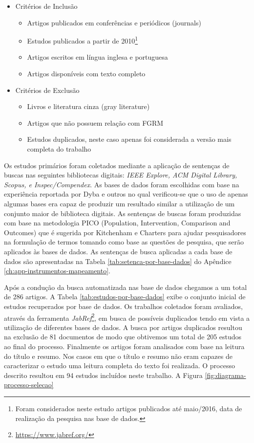 \documentclass[msc]{ppgccufmg} %
\begin{document}
\begin{itemize}
	\item Critérios de Inclusão
		\begin{itemize}
			 \item Artigos publicados em conferências e periódicos (journals)
			 \item Estudos publicados a partir de 2010\footnote{Foram considerados neste estudo artigos publicados até maio/2016, data de realização da pesquisa nas base de dados.}
			 \item Artigos escritos em língua inglesa e portuguesa
			 \item Artigos disponíveis com texto completo
		\end{itemize}
	\item Critérios de Exclusão
		\begin{itemize}
			\item Livros e literatura cinza (gray literature)
			\item Artigos que não possuem relação com FGRM
			\item Estudos duplicados, neste caso apenas foi considerada a versão mais completa do trabalho
		\end{itemize}
\end{itemize}

Os estudos primários foram coletados mediante a aplicação de sentenças de buscas nas seguintes bibliotecas digitais: \textit{IEEE Explore, ACM Digital Library, Scopus, e Inspec/Compendex}. As bases de dados foram escolhidas com base na experiência reportada por Dyba e outros \cite{dybaa2007applying}  no qual verificou-se que o uso de apenas algumas bases era capaz de produzir um resultado similar a utilização de um conjunto maior de biblioteca digitais. As sentenças de buscas foram produzidas com base na metodologia PICO (Population, Intervention, Comparison and Outcomes) que é sugerida por Kitchenham e Charters \cite{keele2007guidelines} para ajudar pesquisadores na formulação de termos tomando como base as questões de pesquisa, que serão aplicados às bases de dados. As sentenças de busca aplicadas a cada base de dados são apresentadas na Tabela \ref{tab:setenca-por-base-dados} do Apêndice \ref{ch:app-instrumentos-mapeamento}.

Após a condução da busca automatizada nas base de dados chegamos a um total de 286 artigos. A Tabela
\ref{tab:estudos-por-base-dados} exibe o conjunto inicial de estudos recuperados por base de dados.
Os trabalhos coletados foram avaliados, através da ferramenta
\textit{JabRef}\footnote{\url{https://www.jabref.org/}}, em busca de possíveis duplicados tendo em
vista a utilização de diferentes bases de dados. A busca por artigos duplicados resultou na exclusão
de 81 documentos de modo que obtivemos um total de 205 estudos ao final do processo. Finalmente os
artigos foram analisados com base na leitura do título e resumo. Nos casos em que o título e resumo
não eram capazes de caracterizar o estudo uma leitura completa do texto foi realizada. O processo
descrito resultou em 94 estudos incluídos neste trabalho. A Figura \ref{fig:diagrama-processo-selecao}
\end{document}
